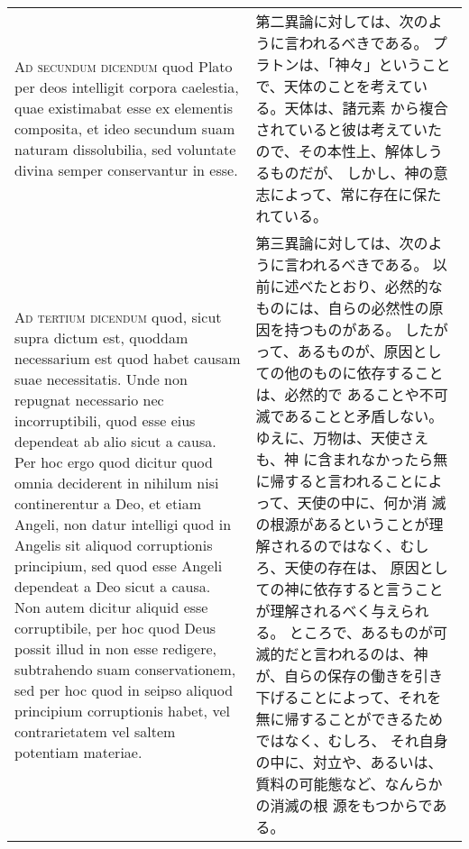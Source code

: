 \documentclass[10pt]{jsarticle} %
\begin{document}
\begin{longtable}{p{21em}p{21em}}
\\


{\scshape Ad secundum dicendum} quod Plato per deos
intelligit corpora caelestia, quae existimabat esse ex elementis
composita, et ideo secundum suam naturam dissolubilia, sed voluntate
divina semper conservantur in esse.


&

第二異論に対しては、次のように言われるべきである。
プラトンは、「神々」ということで、天体のことを考えている。天体は、諸元素
 から複合されていると彼は考えていたので、その本性上、解体しうるものだが、
 しかし、神の意志によって、常に存在に保たれている。

\\


{\scshape Ad tertium dicendum} quod, sicut supra dictum
est, quoddam necessarium est quod habet causam suae necessitatis. Unde
non repugnat necessario nec incorruptibili, quod esse eius dependeat ab
alio sicut a causa. Per hoc ergo quod dicitur quod omnia deciderent in
nihilum nisi continerentur a Deo, et etiam Angeli, non datur intelligi
quod in Angelis sit aliquod corruptionis principium, sed quod esse
Angeli dependeat a Deo sicut a causa. Non autem dicitur aliquid esse
corruptibile, per hoc quod Deus possit illud in non esse redigere,
subtrahendo suam conservationem, sed per hoc quod in seipso aliquod
principium corruptionis habet, vel contrarietatem vel saltem potentiam
materiae.


&
第三異論に対しては、次のように言われるべきである。
以前に述べたとおり、必然的なものには、自らの必然性の原因を持つものがある。
 したがって、あるものが、原因としての他のものに依存することは、必然的で
 あることや不可滅であることと矛盾しない。ゆえに、万物は、天使さえも、神
 に含まれなかったら無に帰すると言われることによって、天使の中に、何か消
 滅の根源があるということが理解されるのではなく、むしろ、天使の存在は、
 原因としての神に依存すると言うことが理解されるべく与えられる。
ところで、あるものが可滅的だと言われるのは、神が、自らの保存の働きを引き
 下げることによって、それを無に帰することができるためではなく、むしろ、
 それ自身の中に、対立や、あるいは、質料の可能態など、なんらかの消滅の根
 源をもつからである。

\end{longtable}
\end{document}
